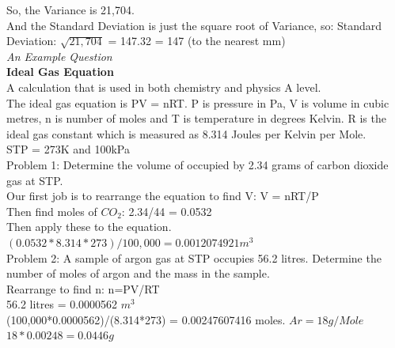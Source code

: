 \documentclass[a4paper,12pt]{report}
\begin{document}
\begin{flushleft}
So, the Variance is 21,704.\\
And the Standard Deviation is just the square root of Variance, so:
Standard Deviation: $\sqrt{21,704}$ = 147.32  = 147 (to the nearest mm)\\


         \emph{ An Example Question}\\
         \bigskip
\textbf{Ideal Gas Equation}\\  A calculation that is used in both chemistry and physics A level.\\
The ideal gas equation is PV = nRT. P is pressure in Pa, V is volume in cubic metres, n is number of moles and T is temperature in degrees Kelvin. R is the ideal gas constant which is measured as 8.314 Joules per Kelvin per Mole.\\
STP = 273K and 100kPa\\
Problem 1: Determine the volume of occupied by 2.34 grams of carbon dioxide gas at STP.\\
Our first job is to rearrange the equation to find V: V = nRT/P\\
Then find moles of ${CO}_{2}$: 2.34/44 =  0.0532\\
Then apply these to the equation.\\
$ (0.0532*8.314*273)/100,000 = 0.0012074921  m^3 $\\
Problem 2: A sample of argon gas at STP occupies 56.2 litres. Determine the number of moles of argon and the mass in the sample.\\
Rearrange to find n: n=PV/RT\\
56.2  litres = 0.0000562 $ m^3 $\\
(100,000*0.0000562)/(8.314*273) = 0.00247607416 moles. $ Ar = 18g/Mole $\\
$ 18*0.00248 = 0.0446g $\\


\end{flushleft}
\end{document}
